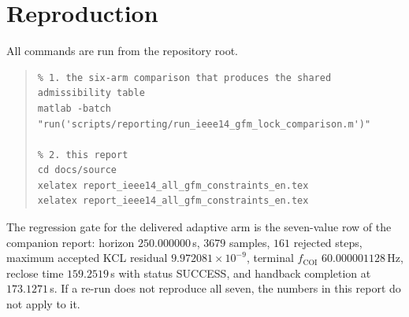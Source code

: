 \documentclass[12pt,a4paper]{article}
\theoremstyle{remark}
\newcommand{\code}[1]{{\ttfamily\small\hyphenchar\font=-1 #1}}
\begin{document}
\section{Reproduction}\label{sec:repro}

All commands are run from the repository root.

\begin{quote}\small
\begin{verbatim}
% 1. the six-arm comparison that produces the shared admissibility table
matlab -batch "run('scripts/reporting/run_ieee14_gfm_lock_comparison.m')"

% 2. this report
cd docs/source
xelatex report_ieee14_all_gfm_constraints_en.tex
xelatex report_ieee14_all_gfm_constraints_en.tex
\end{verbatim}
\end{quote}

\noindent
The regression gate for the delivered adaptive arm is the seven-value row of the
companion report: horizon $250.000000$\,s, $3679$ samples, $161$ rejected steps,
maximum accepted KCL residual $9.972081\times10^{-9}$, terminal
$f_{\mathrm{COI}}$ $60.000001128$\,Hz, reclose time $159.2519$\,s with status
\code{SUCCESS}, and handback completion at $173.1271$\,s. If a re-run does not
reproduce all seven, the numbers in this report do not apply to it.
\end{document}

